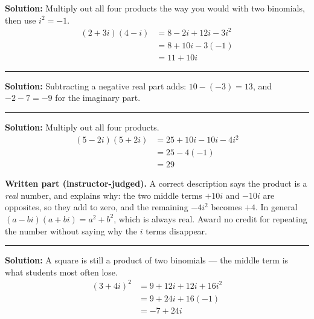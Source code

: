 \documentclass[12pt]{article}
\begin{document}

\textbf{Solution:} Multiply out all four products the way you would with two
binomials, then use $i^2 = -1$.
\begin{align*}
  (2 + 3i)(4 - i) &= 8 - 2i + 12i - 3i^2 \\
                  &= 8 + 10i - 3(-1) \\
                  &= 11 + 10i
\end{align*}

\vspace{0.15cm}
\noindent\rule{\linewidth}{0.2pt}


\textbf{Solution:} Subtracting a negative real part adds: $10 - (-3) = 13$, and
$-2 - 7 = -9$ for the imaginary part. 

\vspace{0.15cm}
\noindent\rule{\linewidth}{0.2pt}


\textbf{Solution:} Multiply out all four products.
\begin{align*}
  (5 - 2i)(5 + 2i) &= 25 + 10i - 10i - 4i^2 \\
                   &= 25 - 4(-1) \\
                   &= 29
\end{align*}

\textbf{Written part (instructor-judged).} A correct description says the
product is a \emph{real} number, and explains why: the two middle terms
$+10i$ and $-10i$ are opposites, so they add to zero, and the remaining
$-4i^2$ becomes $+4$. In general $(a - bi)(a + bi) = a^2 + b^2$, which is
always real. Award no credit for repeating the number without saying why the
$i$ terms disappear.

\vspace{0.15cm}
\noindent\rule{\linewidth}{0.2pt}


\textbf{Solution:} A square is still a product of two binomials --- the middle
term is what students most often lose.
\begin{align*}
  (3 + 4i)^2 &= 9 + 12i + 12i + 16i^2 \\
             &= 9 + 24i + 16(-1) \\
             &= -7 + 24i
\end{align*}
\end{document}
